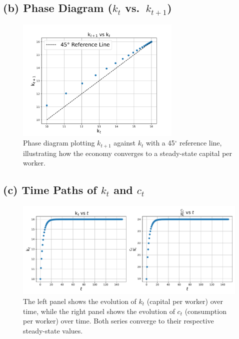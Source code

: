 \documentclass[12pt]{article}
\begin{document}
    \subsection*{(b) Phase Diagram ($k_t$ vs.\ $k_{t+1}$)}
    \begin{figure}[H]
        \centering
        \includegraphics[width=0.7\textwidth]{2(b).pdf}
        \caption{Phase diagram plotting $k_{t+1}$ against $k_{t}$ with a 45$^{\circ}$ reference line, 
        illustrating how the economy converges to a steady-state capital per worker.}
        \label{fig:2(b)}
    \end{figure}
    
    \subsection*{(c) Time Paths of $k_t$ and $c_t$}
    \begin{figure}[H]
        \centering
        \includegraphics[width = 1\textwidth]{2(c).pdf}
        \caption{The left panel shows the evolution of $k_t$ (capital per worker) over time, 
        while the right panel shows the evolution of $c_t$ (consumption per worker) over time. 
        Both series converge to their respective steady-state values.}
        \label{fig:2(c)}
    \end{figure}
    
\end{document}
